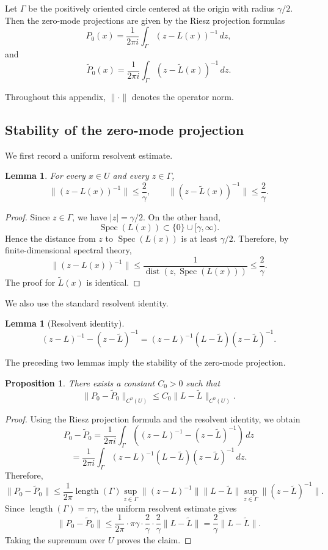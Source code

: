 \documentclass[pdflatex,sn-mathphys-num]{sn-jnl}%
\theoremstyle{thmstyleone}%
\newtheorem{proposition}[theorem]{Proposition}%
\theoremstyle{thmstyletwo}%
\newtheorem{lemma}[theorem]{Lemma}
\theoremstyle{thmstylethree}%
\begin{document}
\begin{appendices}
Let \(\Gamma\) be the positively oriented circle centered at the origin with radius \(\gamma/2\). Then the zero-mode projections are given by the Riesz projection formulas
\[
P_0(x)
=
\frac{1}{2\pi i}
\int_\Gamma
(z-L(x))^{-1}\,dz,
\]
and
\[
\widetilde P_0(x)
=
\frac{1}{2\pi i}
\int_\Gamma
(z-\widetilde L(x))^{-1}\,dz.
\]

Throughout this appendix, \(\|\cdot\|\) denotes the operator norm.

\subsection{Stability of the zero-mode projection}

We first record a uniform resolvent estimate.

\begin{lemma}
For every \(x\in U\) and every \(z\in\Gamma\),
\[
\|(z-L(x))^{-1}\|\le \frac{2}{\gamma},
\qquad
\|(z-\widetilde L(x))^{-1}\|\le \frac{2}{\gamma}.
\]
\end{lemma}

\begin{proof}
Since \(z\in\Gamma\), we have \(|z|=\gamma/2\). On the other hand,
\[
\operatorname{Spec}(L(x))\subset\{0\}\cup[\gamma,\infty).
\]
Hence the distance from \(z\) to \(\operatorname{Spec}(L(x))\) is at least \(\gamma/2\). Therefore, by finite-dimensional spectral theory,
\[
\|(z-L(x))^{-1}\|
\le
\frac{1}{\operatorname{dist}(z,\operatorname{Spec}(L(x)))}
\le
\frac{2}{\gamma}.
\]
The proof for \(\widetilde L(x)\) is identical.
\end{proof}

We also use the standard resolvent identity.

\begin{lemma}[Resolvent identity]
\[
(z-L)^{-1}-(z-\widetilde L)^{-1}
=
(z-L)^{-1}(L-\widetilde L)(z-\widetilde L)^{-1}.
\]
\end{lemma}

The preceding two lemmas imply the stability of the zero-mode projection.

\begin{proposition}
There exists a constant \(C_0>0\) such that
\[
\|P_0-\widetilde P_0\|_{C^0(U)}
\le
C_0\|L-\widetilde L\|_{C^0(U)}.
\]
\end{proposition}

\begin{proof}
Using the Riesz projection formula and the resolvent identity, we obtain
\[
P_0-\widetilde P_0
=
\frac{1}{2\pi i}
\int_\Gamma
\left((z-L)^{-1}-(z-\widetilde L)^{-1}\right)\,dz
\]
\[
=
\frac{1}{2\pi i}
\int_\Gamma
(z-L)^{-1}(L-\widetilde L)(z-\widetilde L)^{-1}\,dz.
\]
Therefore,
\[
\|P_0-\widetilde P_0\|
\le
\frac{1}{2\pi}
\operatorname{length}(\Gamma)
\sup_{z\in\Gamma}\|(z-L)^{-1}\|
\|L-\widetilde L\|
\sup_{z\in\Gamma}\|(z-\widetilde L)^{-1}\|.
\]
Since \(\operatorname{length}(\Gamma)=\pi\gamma\), the uniform resolvent estimate gives
\[
\|P_0-\widetilde P_0\|
\le
\frac{1}{2\pi}\cdot\pi\gamma\cdot
\frac{2}{\gamma}\cdot
\frac{2}{\gamma}
\|L-\widetilde L\|
=
\frac{2}{\gamma}\|L-\widetilde L\|.
\]
Taking the supremum over \(U\) proves the claim.
\end{proof}


\end{appendices}
\end{document}
